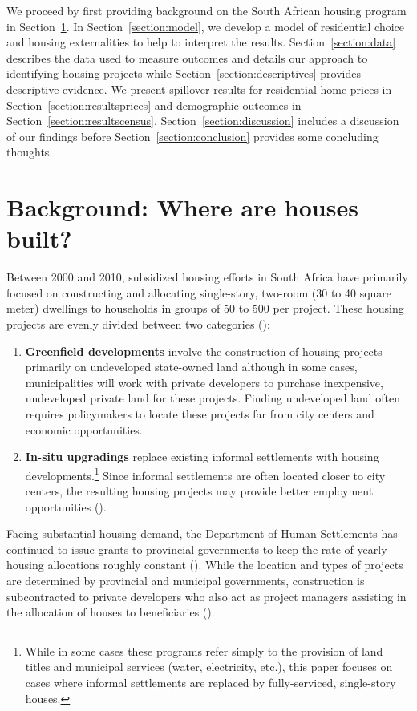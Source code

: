 \documentclass[12pt]{article}
\begin{document}
We proceed by first providing background on the South African housing program in Section~\ref{section:background}.  In Section~\ref{section:model}, we develop a model of residential choice and housing externalities to help to interpret the results. Section~\ref{section:data} describes the data used to measure outcomes and details our approach to identifying housing projects while Section~\ref{section:descriptives} provides descriptive evidence.  We present spillover results for residential home prices in Section~\ref{section:resultsprices} and demographic outcomes in Section~\ref{section:resultscensus}.  Section~\ref{section:discussion} includes a discussion of our findings before Section~\ref{section:conclusion} provides some concluding thoughts.


\section{Background: Where are houses built?}\label{section:background}

Between 2000 and 2010, subsidized housing efforts in South Africa have primarily focused on constructing and allocating single-story, two-room (30 to 40 square meter) dwellings to households in groups of 50 to 500 per project.  These housing projects are evenly divided between two categories (\cite{dhsreports}):
\begin{enumerate}
	\item  \textbf{Greenfield developments} involve the construction of housing projects primarily on undeveloped state-owned land although in some cases, municipalities will work with private developers to purchase inexpensive, undeveloped private land for these projects.  Finding undeveloped land often requires policymakers to locate these projects far from city centers and economic opportunities.  
	\item  \textbf{In-situ upgradings} replace existing informal settlements with housing developments.\footnote{While in some cases these programs refer simply to the provision of land titles and municipal services (water, electricity, etc.), this paper focuses on cases where informal settlements are replaced by fully-serviced, single-story houses.}  Since informal settlements are often located closer to city centers, the resulting housing projects may provide better employment opportunities (\cite{serihistory}).
\end{enumerate}
Facing substantial housing demand, the Department of Human Settlements has continued to issue grants to provincial governments to keep the rate of yearly housing allocations roughly constant (\cite{dhsreports}).  While the location and types of projects are determined by provincial and municipal governments, construction is subcontracted to private developers who also act as project managers assisting in the allocation of houses to beneficiaries (\cite{seriq}).
\end{document}

